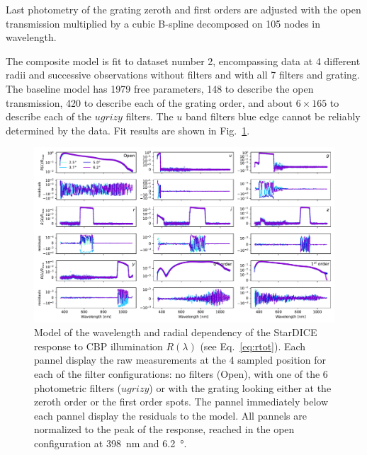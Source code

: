 Last photometry of the grating zeroth and first orders are adjusted
with the open transmission multiplied by a cubic B-spline decomposed
on 105 nodes in wavelength.

The composite model is fit to dataset number 2, encompassing data at 4
different radii and successive observations without filters and with
all 7 filters and grating. The baseline model has \num{1979} free
parameters, \num{148} to describe the open transmission, \num{420} to
describe each of the grating order, and about $6\times165$ to describe
each of the $ugrizy$ filters. The $u$ band filters blue edge cannot be
reliably determined by the data. Fit results are shown in
Fig.~\ref{fig:lambdathetafitresults}.

\begin{figure}
  \centering
  \includegraphics[width=1\linewidth]{./fig/lambdathetafitresults.pdf}
  \caption{Model of the wavelength and radial dependency of the
    StarDICE response to CBP illumination $R(\lambda)$ (see
    Eq.~\ref{eq:rtot}). Each pannel display the raw measurements at
    the 4 sampled position for each of the filter configurations: no
    filters (Open), with one of the 6 photometric filters ($ugrizy$)
    or with the grating looking either at the zeroth order or the
    first order spots. The pannel immediately below each pannel
    display the residuals to the model. All pannels are normalized to
    the peak of the response, reached in the open configuration at
    \SI{398}{nm} and \SI{6.2}{\degree}.  }
  \label{fig:lambdathetafitresults}
\end{figure}

